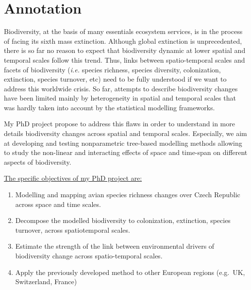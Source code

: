 \documentclass[
  12pt,
  oneside]{report}
\author{François Leroy}
\date{2021-04-08}
\providecommand{\tightlist}{%
  \setlength{\itemsep}{0pt}\setlength{\parskip}{0pt}}
\begin{document}


\cleardoublepage 
{}

{
\hypersetup{linkcolor=}
\setcounter{tocdepth}{1}
\tableofcontents
\newpage
}
\vspace{50mm}


\cleardoublepage 
{}


\hypertarget{annotation}{%
\chapter*{Annotation}\label{annotation}}

Biodiversity, at the basis of many essentials ecosystem services, is in the process of facing its sixth mass extinction. Although global extinction is unprecedented, there is so far no reason to expect that biodiversity dynamic at lower spatial and temporal scales follow this trend. Thus, links between
spatio-temporal scales and facets of biodiversity (\emph{i.e.} species richness, species diversity, colonization, extinction,
species turnover, etc) need to be fully understood if we want to address this worldwide crisis. So far,
attempts to describe biodiversity changes have been limited mainly by heterogeneity in spatial and
temporal scales that was hardly taken into account by the statistical modelling frameworks.

My PhD project propose to address this flaws in order to understand in more details biodiversity
changes across spatial and temporal scales. Especially, we aim at developing and testing nonparametric
tree-based modelling methods allowing to study the non-linear and interacting effects of
space and time-span on different aspects of biodiversity.

\underline{The specific objectives of my PhD project are:}

\begin{enumerate}
\def\labelenumi{\arabic{enumi}.}
\tightlist
\item
  Modelling and mapping avian species richness changes over Czech Republic across space and time
  scales.
\item
  Decompose the modelled biodiversity to colonization, extinction, species turnover, across spatiotemporal
  scales.
\item
  Estimate the strength of the link between environmental drivers of biodiversity change across
  spatio-temporal scales.
\item
  Apply the previously developed method to other European regions (e.g.~UK, Switzerland, France)
\end{enumerate}
\end{document}
